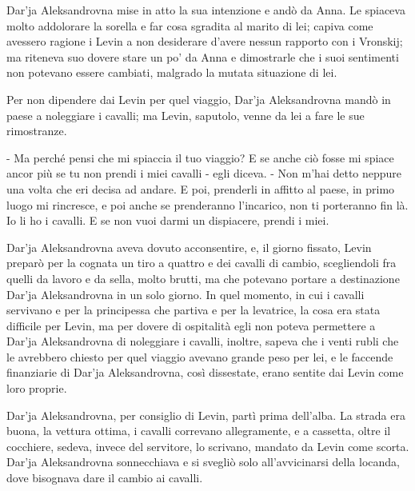 \label{xvi-5} 

Dar'ja Aleksandrovna mise in atto la sua intenzione e andò da Anna. Le spiaceva molto addolorare la sorella e far cosa sgradita al marito di lei; capiva come avessero ragione i Levin a non desiderare d'avere nessun rapporto con i Vronskij; ma riteneva suo dovere stare un po' da Anna e dimostrarle che i suoi sentimenti non potevano essere cambiati, malgrado la mutata situazione di lei. 

Per non dipendere dai Levin per quel viaggio, Dar'ja Aleksandrovna mandò in paese a noleggiare i cavalli; ma Levin, saputolo, venne da lei a fare le sue rimostranze. 

- Ma perché pensi che mi spiaccia il tuo viaggio? E se anche ciò fosse mi spiace ancor più se tu non prendi i miei cavalli - egli diceva. - Non m'hai detto neppure una volta che eri decisa ad andare. E poi, prenderli in affitto al paese, in primo luogo mi rincresce, e poi anche se prenderanno l'incarico, non ti porteranno fin là. Io li ho i cavalli. E se non vuoi darmi un dispiacere, prendi i miei. 

Dar'ja Aleksandrovna aveva dovuto acconsentire, e, il giorno fissato, Levin preparò per la cognata un tiro a quattro e dei cavalli di cambio, scegliendoli fra quelli da lavoro e da sella, molto brutti, ma che potevano portare a destinazione Dar'ja Aleksandrovna in un solo giorno. In quel momento, in cui i cavalli servivano e per la principessa che partiva e per la levatrice, la cosa era stata difficile per Levin, ma per dovere di ospitalità egli non poteva permettere a Dar'ja Aleksandrovna di noleggiare i cavalli, inoltre, sapeva che i venti rubli che le avrebbero chiesto per quel viaggio avevano grande peso per lei, e le faccende finanziarie di Dar'ja Aleksandrovna, così dissestate, erano sentite dai Levin come loro proprie. 

Dar'ja Aleksandrovna, per consiglio di Levin, partì prima dell'alba. La strada era buona, la vettura ottima, i cavalli correvano allegramente, e a cassetta, oltre il cocchiere, sedeva, invece del servitore, lo scrivano, mandato da Levin come scorta. Dar'ja Aleksandrovna sonnecchiava e si svegliò solo all'avvicinarsi della locanda, dove bisognava dare il cambio ai cavalli. 

